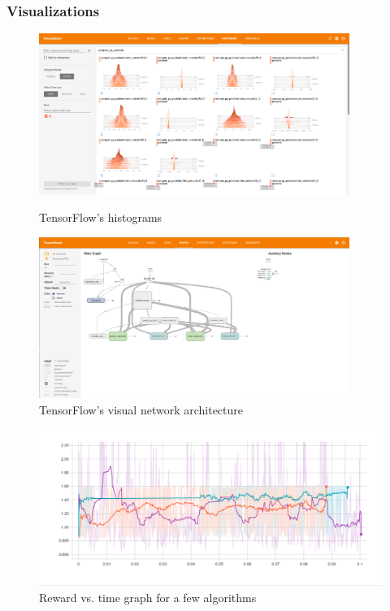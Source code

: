 \documentclass[handout]{beamer}
\begin{document}
\begin{frame}
    \frametitle{Visualizations}
    \begin{figure}
        \centering
        \begin{minipage}{0.45\textwidth}
            \centering
            \includegraphics[width=0.9\textwidth]{ex1} %
            \caption{TensorFlow's histograms}
            \end{minipage}\hfill
            \begin{minipage}{0.45\textwidth}
                \centering
                \includegraphics[width=0.9\textwidth]{ex2} %
                \caption{TensorFlow's visual network architecture}
            \end{minipage}
        \end{figure}
        \begin{figure}
            \includegraphics[scale=0.1]{smoothed}
            \caption{Reward vs. time graph for a few algorithms}
        \end{figure}
    \end{frame}
\end{document}
